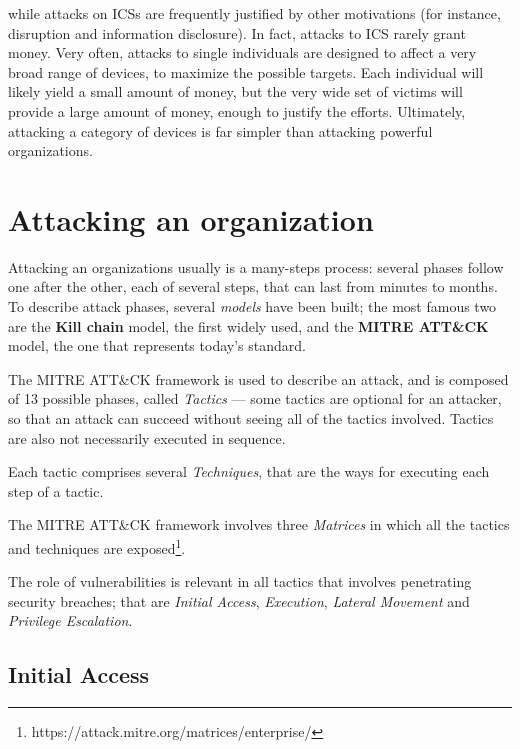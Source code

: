 \documentclass[10pt]{\classname}
\begin{document}
while attacks on ICSs are frequently justified by other motivations (for
instance, disruption and information disclosure). In fact, attacks to ICS
rarely grant money. Very often, attacks to single individuals are designed to
affect a very broad range of devices, to maximize the possible targets. Each
individual will likely yield a small amount of money, but the very wide set of
victims will provide a large amount of money, enough to justify the efforts.
Ultimately, attacking a category of devices is far simpler than attacking
powerful organizations.






\section{Attacking an organization}

Attacking an organizations usually is a many\--steps process: several phases
follow one after the other, each of several steps, that can last from minutes
to months. To describe attack phases, several \emph{models} have been built;
the most famous two are the \textbf{Kill chain} model, the first widely used,
and the \textbf{MITRE ATT\&CK} model, the one that represents today's standard.

The MITRE ATT\&CK framework is used to describe an attack, and is composed of
13 possible phases, called \emph{Tactics} --- some tactics are optional for an
attacker, so that an attack can succeed without seeing all of the tactics
involved. Tactics are also not necessarily executed in sequence.

Each tactic comprises several \emph{Techniques}, that are the ways for
executing each step of a tactic.

The MITRE ATT\&CK framework involves three \emph{Matrices} in which all the
tactics and techniques are
exposed\footnote{https://attack.mitre.org/matrices/enterprise/}.

The role of vulnerabilities is relevant in all tactics that involves
penetrating security breaches; that are \emph{Initial Access},
\emph{Execution}, \emph{Lateral Movement} and \emph{Privilege Escalation}.

\subsection{Initial Access}
\end{document}
